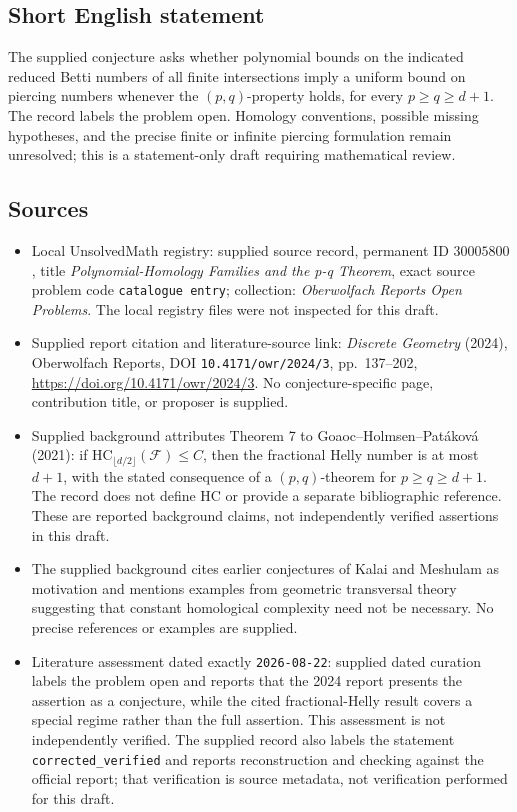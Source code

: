\documentclass[11pt]{article}
\begin{document}
\subsection{Short English statement}
The supplied conjecture asks whether polynomial bounds on the indicated reduced Betti numbers of all finite intersections imply a uniform bound on piercing numbers whenever the \((p,q)\)-property holds, for every \(p\geq q\geq d+1\). The record labels the problem open. Homology conventions, possible missing hypotheses, and the precise finite or infinite piercing formulation remain unresolved; this is a statement-only draft requiring mathematical review.
\subsection{Sources}
\begin{itemize}
\item Local UnsolvedMath registry: supplied source record, permanent ID \(30005800\), title \emph{Polynomial-Homology Families and the p-q Theorem}, exact source problem code \texttt{catalogue entry}; collection: \emph{Oberwolfach Reports Open Problems}. The local registry files were not inspected for this draft.
\item Supplied report citation and literature-source link: \emph{Discrete Geometry} (2024), Oberwolfach Reports, DOI \texttt{10.4171/owr/2024/3}, pp.\ 137--202, \url{https://doi.org/10.4171/owr/2024/3}. No conjecture-specific page, contribution title, or proposer is supplied.
\item Supplied background attributes Theorem 7 to Goaoc--Holmsen--Pat\'akov\'a (2021): if \(\mathrm{HC}_{\lfloor d/2\rfloor}(\mathcal F)\leq C\), then the fractional Helly number is at most \(d+1\), with the stated consequence of a \((p,q)\)-theorem for \(p\geq q\geq d+1\). The record does not define \(\mathrm{HC}\) or provide a separate bibliographic reference. These are reported background claims, not independently verified assertions in this draft.
\item The supplied background cites earlier conjectures of Kalai and Meshulam as motivation and mentions examples from geometric transversal theory suggesting that constant homological complexity need not be necessary. No precise references or examples are supplied.
\item Literature assessment dated exactly \texttt{2026-08-22}: supplied dated curation labels the problem open and reports that the 2024 report presents the assertion as a conjecture, while the cited fractional-Helly result covers a special regime rather than the full assertion. This assessment is not independently verified. The supplied record also labels the statement \texttt{corrected\_verified} and reports reconstruction and checking against the official report; that verification is source metadata, not verification performed for this draft.
\end{itemize}
\end{document}
